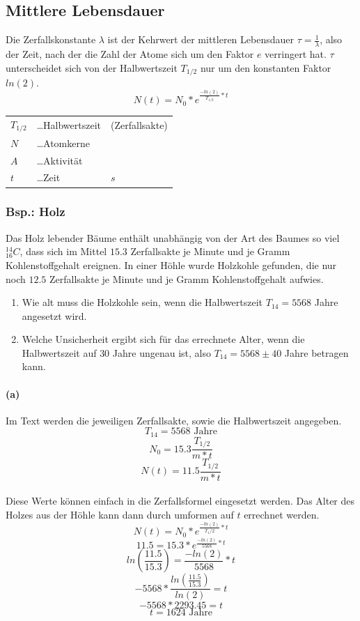 \documentclass{school}
\begin{document}
\subsection{Mittlere Lebensdauer}
Die Zerfallskonstante $\lambda$ ist der Kehrwert der mittleren Lebensdauer $\tau = \frac{1}{\lambda}$, also der Zeit, nach der die Zahl der Atome sich um den Faktor $e$ verringert hat. $\tau$ unterscheidet sich von der Halbwertszeit $T_{1/2}$ nur um den konstanten Faktor $ln(2)$.
$$N(t) = N_0 * e^{\frac{-ln(2)}{T_{1/2}} * t}$$
\begin{center}
    \begin{tabular}{l l l}
        $T_{1/2}$ &\dots Halbwertszeit & \small{(Zerfallsakte)}\\
        $N$ &\dots Atomkerne &\\
        $A$ &\dots Aktivität &\\
        $t$ &\dots Zeit & $s$
    \end{tabular}
\end{center}

\newpage
\subsubsection{Bsp.: Holz}
Das Holz lebender Bäume enthält unabhängig von der Art des Baumes so viel $^{14}_{16}C$, dass sich im Mittel $15.3$ Zerfallsakte je Minute und je Gramm Kohlenstoffgehalt ereignen. In einer Höhle wurde Holzkohle gefunden, die nur noch $12.5$ Zerfallsakte je Minute und je Gramm Kohlenstoffgehalt aufwies.
\begin{enumerate}[label= (\alph*)]
    \item Wie alt muss die Holzkohle sein, wenn die Halbwertszeit $T_{14} = 5568$ Jahre angesetzt wird.
    \item Welche Unsicherheit ergibt sich für das errechnete Alter, wenn die Halbwertszeit auf $30$ Jahre ungenau ist, also $T_14 = 5568 \pm 40$ Jahre betragen kann.
\end{enumerate}
\paragraph*{(a)}
Im Text werden die jeweiligen Zerfallsakte, sowie die Halbwertszeit angegeben.
$$T_{14} = 5568 \text{ Jahre}$$
$$N_0 = 15.3 \frac{T_{1/2}}{m * t}$$
$$N(t) = 11.5 \frac{T_{1/2}}{m * t}$$
~\\
Diese Werte können einfach in die Zerfallsformel eingesetzt werden. Das Alter des Holzes aus der Höhle kann dann durch umformen auf $t$ errechnet werden.
$$N(t) = N_0 * e^{\frac{-ln(2)}{T_1/2} * t}$$
$$11.5 = 15.3 * e^{\frac{-ln(2)}{5568} * t}$$
$$ln(\frac{11.5}{15.3}) = \frac{-ln(2)}{5568} * t$$
$$- 5568 * \frac{ln(\frac{11.5}{15.3})}{ln(2)} = t$$
$$- 5568 * 2293.45 = t$$
$$t = 1624 \text{ Jahre}$$
\end{document}
